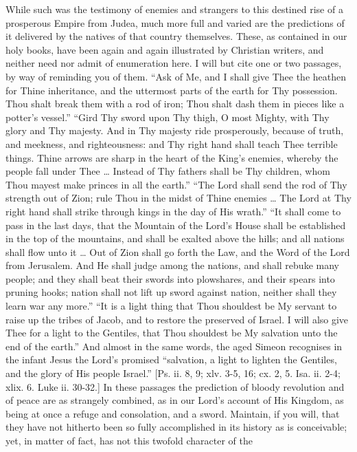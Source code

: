 While such was the testimony of enemies and strangers to this
destined rise of a prosperous Empire from Judea, much more full and
varied are the predictions of it delivered by the natives of that
country themselves. These, as contained in our holy books, have been
again and again illustrated by Christian writers, and neither need nor
admit of enumeration here. I will but cite one or two passages, by way
of reminding you of them. ``Ask of Me, and I shall give Thee the
heathen for Thine inheritance, and the uttermost parts of the earth for
Thy possession. Thou shalt break them with a rod of iron; Thou shalt
dash them in pieces like a potter's vessel.'' ``Gird Thy sword
upon Thy thigh, O most Mighty, with Thy glory and Thy majesty. And in
Thy majesty ride prosperously, because of truth, and meekness, and
righteousness: and Thy right hand shall teach Thee terrible things.
Thine arrows are sharp in the heart of the King's enemies, whereby the
people fall under Thee … Instead of Thy fathers shall be Thy children,
whom Thou mayest make princes in all the earth.'' ``The Lord
shall send the rod of Thy strength out of Zion; rule Thou in the midst
of Thine enemies … The Lord at Thy right hand shall strike through
kings in the day of His wrath.'' ``It shall come to pass in the
last days, that the Mountain of the Lord's House shall be established in
the top of the mountains, and shall be exalted above the hills; and all
nations shall flow unto it … Out of Zion shall go forth the Law, and
the Word of the Lord from Jerusalem. And He shall judge among the
nations, and shall rebuke many people; and they shall beat their swords
into plowshares, and their spears into pruning hooks; nation shall not
lift up sword against nation, neither shall they learn war any
more.'' ``It is a light thing that Thou shouldest be My servant
to raise up the tribes of Jacob, and to restore the preserved of Israel.
I will also give Thee for a light to the Gentiles, that Thou shouldest
be My salvation unto the end of the earth.'' And almost in the same
words, the aged Simeon recognises in the infant Jesus the Lord's
promised ``salvation, a light to lighten the Gentiles, and the glory
of His people Israel.'' [Ps. ii. 8, 9; xlv. 3-5, 16; cx. 2, 5. Isa.
ii. 2-4; xlix. 6. Luke ii. 30-32.] In these passages the prediction of
bloody revolution and of peace are as strangely combined, as in our
Lord's account of His Kingdom, as being at once a refuge and
consolation, and a sword. Maintain, if you will, that they have not
hitherto been so fully accomplished in its history as is conceivable;
yet, in matter of fact, has not this twofold character of the
